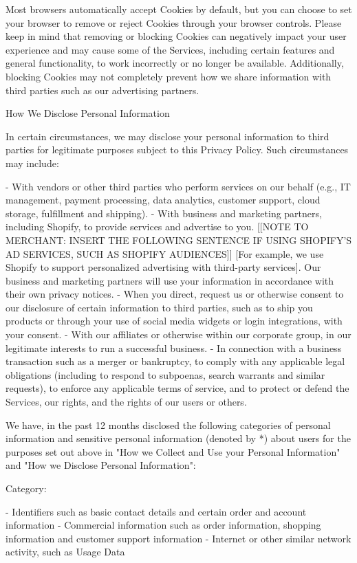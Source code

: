 \documentclass[conference]{IEEEtran}
\begin{document}
Most browsers automatically accept Cookies by default, but you can choose to set your browser to remove or reject Cookies through your browser controls. Please keep in mind that removing or blocking Cookies can negatively impact your user experience and may cause some of the Services, including certain features and general functionality, to work incorrectly or no longer be available. Additionally, blocking Cookies may not completely prevent how we share information with third parties such as our advertising partners.

How We Disclose Personal Information

In certain circumstances, we may disclose your personal information to third parties for legitimate purposes subject to this Privacy Policy. Such circumstances may include:

- With vendors or other third parties who perform services on our behalf (e.g., IT management, payment processing, data analytics, customer support, cloud storage, fulfillment and shipping).
- With business and marketing partners, including Shopify, to provide services and advertise to you. [[NOTE TO MERCHANT: INSERT THE FOLLOWING SENTENCE IF USING SHOPIFY'S AD SERVICES, SUCH AS SHOPIFY AUDIENCES]] [For example, we use Shopify to support personalized advertising with third-party services]. Our business and marketing partners will use your information in accordance with their own privacy notices.
- When you direct, request us or otherwise consent to our disclosure of certain information to third parties, such as to ship you products or through your use of social media widgets or login integrations, with your consent.
- With our affiliates or otherwise within our corporate group, in our legitimate interests to run a successful business.
- In connection with a business transaction such as a merger or bankruptcy, to comply with any applicable legal obligations (including to respond to subpoenas, search warrants and similar requests), to enforce any applicable terms of service, and to protect or defend the Services, our rights, and the rights of our users or others.

We have, in the past 12 months disclosed the following categories of personal information and sensitive personal information (denoted by *) about users for the purposes set out above in "How we Collect and Use your Personal Information" and "How we Disclose Personal Information":

Category:

- Identifiers such as basic contact details and certain order and account information
- Commercial information such as order information, shopping information and customer support information
- Internet or other similar network activity, such as Usage Data
\end{document}
